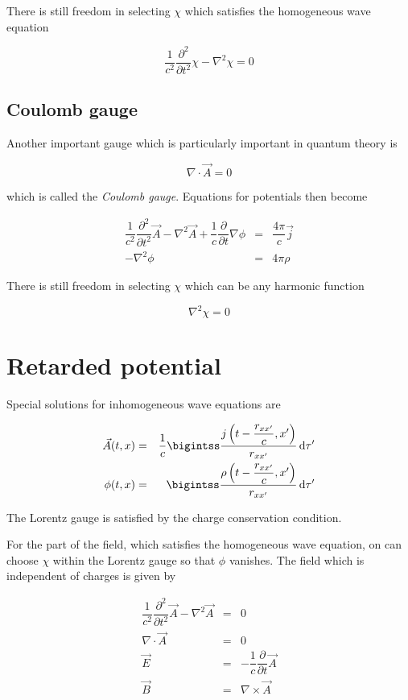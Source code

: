 \documentclass{article}
\begin{document}
There is still freedom in selecting $\chi$ which satisfies the homogeneous wave equation

\begin{equation*}
\dfrac{1}{c^2} \dfrac{\partial^2}{\partial t^2} \chi - \nabla^2 \chi = 0
\end{equation*}

\subsection{Coulomb gauge}

Another important gauge which is particularly important in quantum theory is

\begin{equation*}
\nabla \cdot \vec{A} = 0
\end{equation*}

which is called the \textit{Coulomb gauge}. Equations for potentials then become

\begin{eqnarray*}
\dfrac{1}{c^2} \dfrac{\partial^2}{\partial t^2} \vec{A} - \nabla^2 \vec{A} + \dfrac{1}{c} \dfrac{\partial}{\partial t} \nabla \phi & = & \dfrac{4 \pi}{c} \vec{j} \\
- \nabla^2 \phi & = & 4 \pi \rho
\end{eqnarray*}

There is still freedom in selecting $\chi$ which can be any harmonic function

\begin{equation*}
\nabla^2 \chi = 0
\end{equation*}

\section{Retarded potential}

Special solutions for inhomogeneous wave equations are

\begin{eqnarray*}
\vec{A}(t,x) & = & \dfrac{1}{c} \bigintss \dfrac{j\left(t - \dfrac{r_{x x'}}{c}, x'\right)}{r_{x x'}} \, \mathrm{d} \tau' \\
\phi(t,x) & = & \bigintss \dfrac{\rho\left(t - \dfrac{r_{x x'}}{c}, x'\right)}{r_{x x'}} \, \mathrm{d} \tau'
\end{eqnarray*}

The Lorentz gauge is satisfied by the charge conservation condition.

For the part of the field, which satisfies the homogeneous wave equation, on can choose $\chi$ within the Lorentz gauge so that $\phi$ vanishes. The field which is independent of charges is given by

\begin{eqnarray*}
\dfrac{1}{c^2} \dfrac{\partial^2}{\partial t^2} \vec{A} - \nabla^2 \vec{A} & = & 0 \\
\nabla \cdot \vec{A} & = & 0 \\
\vec{E} & = & - \dfrac{1}{c} \dfrac{\partial}{\partial t} \vec{A} \\
\vec{B} & = & \nabla \times \vec{A}
\end{eqnarray*}
\end{document}
